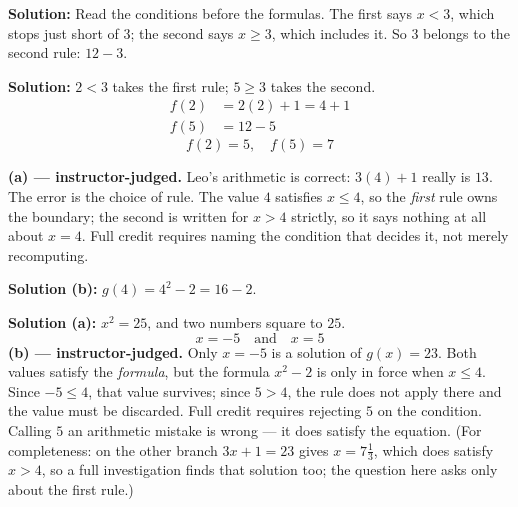 \documentclass[12pt]{article}
\begin{document}




\textbf{Solution:} Read the conditions before the formulas. The first says $x < 3$, which stops just short of $3$; the second says $x \ge 3$, which includes it. So $3$ belongs to the second rule: $12 - 3$. 


\textbf{Solution:} $2 < 3$ takes the first rule; $5 \ge 3$ takes the second.
\begin{align*}
  f(2) &= 2(2) + 1 = 4 + 1 \\
  f(5) &= 12 - 5
\end{align*}
\[ \boxed{f(2) = 5, \quad f(5) = 7} \]


\textbf{(a) --- instructor-judged.} Leo's arithmetic is correct: $3(4)+1$ really is $13$. The error is the choice of rule. The value $4$ satisfies $x \le 4$, so the \emph{first} rule owns the boundary; the second is written for $x > 4$ strictly, so it says nothing at all about $x = 4$. Full credit requires naming the condition that decides it, not merely recomputing.

\textbf{Solution (b):} $g(4) = 4^2 - 2 = 16 - 2$. 


\textbf{Solution (a):} $x^2 = 25$, and two numbers square to $25$.
\[ \boxed{x = -5 \quad \text{and} \quad x = 5} \]
\textbf{(b) --- instructor-judged.} Only $x = -5$ is a solution of $g(x) = 23$. Both values satisfy the \emph{formula}, but the formula $x^2 - 2$ is only in force when $x \le 4$. Since $-5 \le 4$, that value survives; since $5 > 4$, the rule does not apply there and the value must be discarded. Full credit requires rejecting $5$ on the condition. Calling $5$ an arithmetic mistake is wrong --- it does satisfy the equation. (For completeness: on the other branch $3x + 1 = 23$ gives $x = 7\tfrac{1}{3}$, which does satisfy $x > 4$, so a full investigation finds that solution too; the question here asks only about the first rule.)
\end{document}
